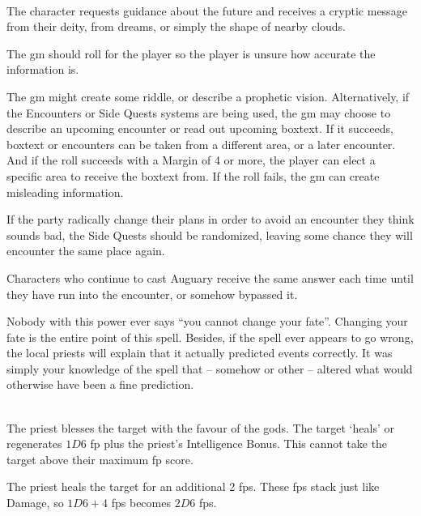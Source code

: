 \begin{multicols}{2}
\spelllevel

\\
The character requests guidance about the future and receives a cryptic message from their deity, from dreams, or simply the shape of nearby clouds.

The \gls{gm} should roll for the player so the player is unsure how accurate the information is.

The \gls{gm} might create some riddle, or describe a prophetic vision.
Alternatively, if the Encounters or Side Quests systems are being used, the \gls{gm} may choose to describe an upcoming encounter or read out upcoming boxtext.\iftoggle{verbose}{\footnote{See page \pageref{encounters}.}}{}
If it succeeds, boxtext or encounters can be taken from a different area, or a later encounter.
And if the roll succeeds with a Margin of 4 or more, the player can elect a specific area to receive the boxtext from.
If the roll fails, the \gls{gm} can create misleading information.

If the party radically change their plans in order to avoid an encounter they think sounds bad, the Side Quests should be randomized, leaving some chance they will encounter the same place again.

Characters who continue to cast Auguary receive the same answer each time until they have run into the encounter, or somehow bypassed it.

Nobody with this power ever says ``you cannot change your fate''.  Changing your fate is the entire point of this spell.  Besides, if the spell ever appears to go wrong, the local priests will explain that it actually predicted events correctly.  It was simply your knowledge of the spell that -- somehow or other -- altered what would otherwise have been a fine prediction.

\\
The priest blesses the target with the favour of the gods. The target `heals' or regenerates $1D6$ \gls{fp} plus the priest's Intelligence Bonus. This cannot take the target above their maximum \gls{fp} score.


The priest heals the target for an additional 2 \glspl{fp}.
These \glspl{fp} stack just like Damage, so $1D6+4$ \glspl{fp} becomes $2D6$ \glspl{fp}.


\end{multicols}
